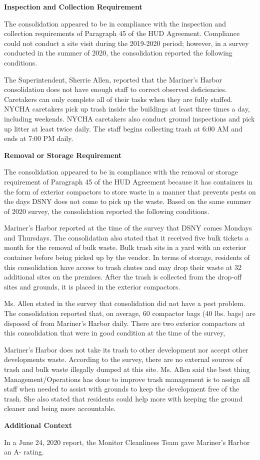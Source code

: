  

\textbf{Inspection and Collection Requirement} 

 

The consolidation appeared to be in compliance with the inspection and collection requirements of Paragraph 45 of the HUD Agreement. Compliance could not conduct a site visit during the 2019-2020 period; however, in a survey conducted in the summer of 2020, the consolidation reported the following conditions.

The Superintendent, Sherrie Allen, reported that the Mariner's Harbor consolidation does not have enough staff to correct observed deficiencies. Caretakers can only complete all of their tasks when they are fully staffed. NYCHA caretakers pick up trash inside the buildings at least three times a day, including weekends. NYCHA caretakers also conduct ground inspections and pick up litter at least twice daily. The staff begins collecting trash at 6:00 AM and ends at 7:00 PM daily.

\textbf{Removal or Storage Requirement} 

The consolidation appeared to be in compliance with the removal or storage requirement of Paragraph  45 of the HUD Agreement because it has containers in the form of exterior compactors to store waste in a manner that prevents pests on the days DSNY does not come to pick up the waste. Based on the same summer of  2020  survey, the consolidation reported the following conditions.

  

Mariner's Harbor reported at the time of the survey that DSNY comes Mondays and Thursdays. The consolidation also stated that it received five bulk tickets a month for the removal of bulk waste. Bulk trash sits in a yard with an exterior container before being picked up by the vendor. In terms of storage, residents of this consolidation have access to trash chutes and may drop their waste at 32 additional sites on the premises. After the trash is collected from the drop-off sites and grounds, it is placed in the exterior compactors. 

 

Ms. Allen stated in the survey that consolidation did not have a pest problem. The consolidation reported that, on average, 60 compactor bags (40 lbs. bags)  are disposed of from Mariner's Harbor daily. There are two exterior compactors at this consolidation that were in good condition at the time of the survey, 

Mariner's Harbor does not take its trash to other development nor accept other developments waste. According to the survey, there are no external sources of trash and bulk waste illegally dumped at this site. Ms. Allen said the best thing Management/Operations has done to improve trash management is to assign all staff when needed to assist with grounds to keep the development free of the trash. She also stated that residents could help more with keeping the ground cleaner and being more accountable. 


\textbf{Additional Context}  

In a June 24, 2020 report, the Monitor Cleanliness Team gave Mariner's Harbor an A- rating.  

 